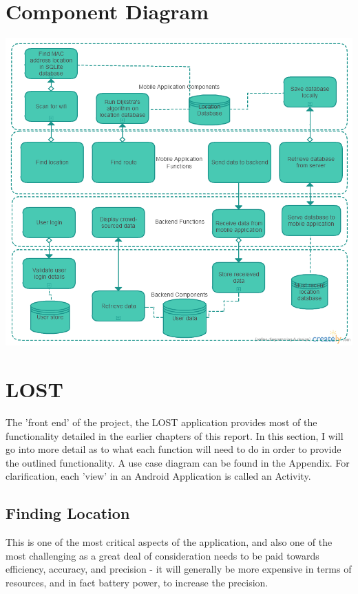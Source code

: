 \documentclass[11pt]{informatics-report}
\begin{document}
\section{Component Diagram}
\centerline{\includegraphics[scale=0.6]{ComponentDiagram}}
\newpage

\section{LOST}

The 'front end' of the project, the LOST application provides most of the functionality detailed in the earlier chapters of this report. In this section, I will go into more detail as to what each function will need to do in order to provide the outlined functionality. A use case diagram can be found in the Appendix. For clarification, each 'view' in an Android Application is called an Activity.

\subsection{Finding Location}

This is one of the most critical aspects of the application, and also one of the most challenging as a great deal of consideration needs to be paid towards efficiency, accuracy, and precision - it will generally be more expensive in terms of resources, and in fact battery power, to increase the precision.
\end{document}
